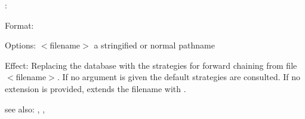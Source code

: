 :

Format: 

Options: $<$filename$>$ a stringified or normal pathname

Effect: Replacing the database  with the strategies for forward 
	chaining from file $<$filename$>$. If no argument is given the default 
	strategies are consulted. 
	If no extension is provided, \COLAB{} extends the filename with .

see also: \consult, \destroy, \replace
